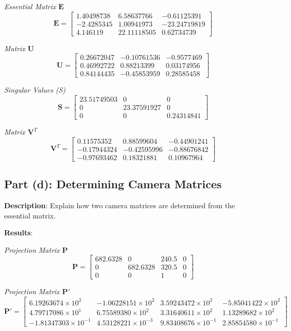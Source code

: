 \documentclass{article}
\begin{document}
\textit{Essential Matrix $\mathbf{E}$}
\[
\mathbf{E} = \begin{bmatrix}
1.40498738 & 6.58637766 & -0.61125391 \\ 
-2.4285345 & 1.00941973 & -23.24719819 \\ 
4.146119 & 22.11118505 & 0.62734739 
\end{bmatrix}
\]

\textit{Matrix $\mathbf{U}$}
\[
\mathbf{U} = \begin{bmatrix}
0.26672047 & -0.10761536 & -0.9577469 \\ 
0.46992722 & 0.88213399 & 0.03174956 \\ 
0.84144435 & -0.45853959 & 0.28585458 
\end{bmatrix}
\]

\textit{Singular Values (S)}
\[
\mathbf{S} = \begin{bmatrix}
23.51749503 & 0 & 0 \\ 
0 & 23.37591927 & 0 \\ 
0 & 0 & 0.24314841 
\end{bmatrix}
\]

\textit{Matrix $\mathbf{V}^T$}
\[
\mathbf{V}^T = \begin{bmatrix}
0.11575352 & 0.88599604 & -0.44901241 \\ 
-0.17944324 & -0.42595996 & -0.88676842 \\ 
-0.97693462 & 0.18321881 & 0.10967964 
\end{bmatrix}
\]


\subsection{Part (d): Determining Camera Matrices}
\textbf{Description}: Explain how two camera matrices are determined from the essential matrix.

\textbf{Results}: 

\textit{Projection Matrix $\mathbf{P}$}
\[
\mathbf{P} = \begin{bmatrix}
682.6328 & 0 & 240.5 & 0 \\ 
0 & 682.6328 & 320.5 & 0 \\ 
0 & 0 & 1 & 0 
\end{bmatrix}
\]

\textit{Projection Matrix $\mathbf{P}'$}
\[
\mathbf{P}' = \begin{bmatrix}
6.19263674 \times 10^{2} & -1.06228151 \times 10^{2} & 3.59243472 \times 10^{2} & -5.85041422 \times 10^{2} \\ 
4.79717086 \times 10^{1} & 6.75589380 \times 10^{2} & 3.31640611 \times 10^{2} & 1.13289682 \times 10^{2} \\ 
-1.81347303 \times 10^{-1} & 4.53128221 \times 10^{-3} & 9.83408676 \times 10^{-1} & 2.85854580 \times 10^{-1} 
\end{bmatrix}
\]
\end{document}
